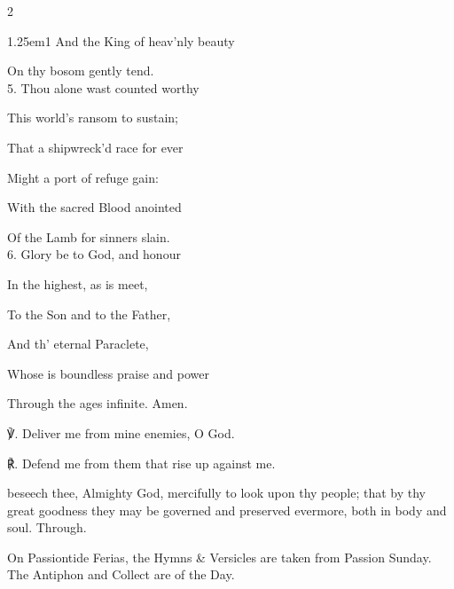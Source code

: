 \begin{paracol}{2}
\begin{hangparas}{1.25em}{1}
And the King of heav'nly beauty

On thy bosom gently tend.\\

5. Thou alone wast counted worthy

This world's ransom to sustain;

That a shipwreck'd race for ever

Might a port of refuge gain:

With the sacred Blood anointed

Of the Lamb for sinners slain.\\

6. Glory be to God, and honour

In the highest, as is meet,

To the Son and to the Father,

And th' eternal Paraclete,

Whose is boundless praise and power

Through the ages infinite. Amen.	\\
\end{hangparas}

℣. Deliver me from mine enemies, O God.

℟. Defend me from them that rise up against me.


\end{paracol}

\secondEvensong




\collect
{} beseech thee, Almighty God, mercifully to look upon thy people; that by thy great goodness they may be governed and preserved evermore, both in body and soul. Through.

\begin{rubric}
	On Passiontide Ferias, the Hymns \& Versicles are taken from Passion Sunday. The Antiphon and Collect are of the Day.
\end{rubric}


\clearpage
{}

